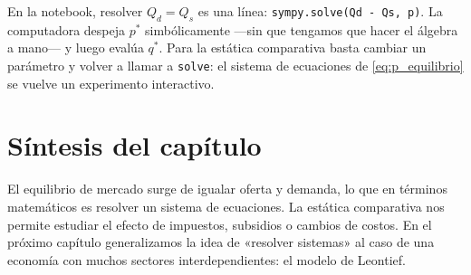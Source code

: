 \begin{labbox}
En la notebook, resolver $Q_d = Q_s$ es una línea: \texttt{sympy.solve(Qd - Qs, p)}. La computadora despeja $p^{*}$ simbólicamente —sin que tengamos que hacer el álgebra a mano— y luego evalúa $q^{*}$. Para la estática comparativa basta cambiar un parámetro y volver a llamar a \texttt{solve}: el sistema de ecuaciones de \eqref{eq:p_equilibrio} se vuelve un experimento interactivo.
\end{labbox}

\section{Síntesis del capítulo}

El equilibrio de mercado surge de igualar oferta y demanda, lo que en términos matemáticos es resolver un sistema de ecuaciones. La estática comparativa nos permite estudiar el efecto de impuestos, subsidios o cambios de costos. En el próximo capítulo generalizamos la idea de «resolver sistemas» al caso de una economía con muchos sectores interdependientes: el modelo de Leontief.
